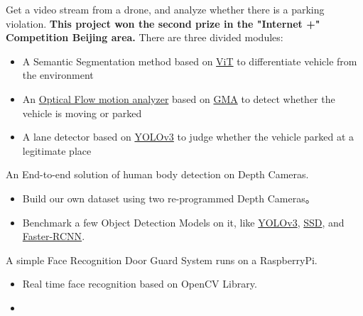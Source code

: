 \documentclass{resume}
\begin{document}
Get a video stream from a drone, and analyze whether there is a parking violation.  \textbf{This project won the second prize in the "Internet +" Competition Beijing area.} There are three divided modules:
\begin{itemize}
  \item A Semantic Segmentation method based on \href{https://arxiv.org/abs/2205.08534v3}{ViT} to differentiate vehicle from the environment
  \item An \href{https://github.com/open-mmlab/mmflow}{Optical Flow motion analyzer} based on \href{https://arxiv.org/abs/2104.02409}{GMA} to detect whether the vehicle is moving or parked
  \item A lane detector based on \href{https://arxiv.org/abs/1804.02767}{YOLOv3} to judge whether the vehicle parked at a legitimate place
\end{itemize}

An End-to-end solution of human body detection on Depth Cameras.
\begin{itemize}
  \item Build our own dataset using two re-programmed Depth Cameras。 
  \item Benchmark a few Object Detection Models on it, like \href{https://arxiv.org/abs/1804.02767}{YOLOv3}, \href{https://arxiv.org/abs/1512.02325v5}{SSD}, and \href{https://arxiv.org/abs/1506.01497v3}{Faster-RCNN}.
\end{itemize}

A simple Face Recognition Door Guard System runs on a RaspberryPi.
\begin{itemize}
  \item Real time face recognition based on OpenCV Library. 
  \item {}
\end{itemize}
\end{document}
